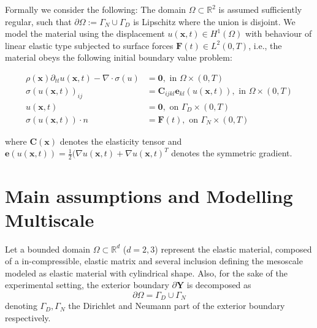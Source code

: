 Formally we consider the following:
The domain $\Omega \subset \mathbb{R}^2$ is assumed sufficiently regular, such that $\partial \Omega := \Gamma_N \cup \Gamma_D$ is Lipschitz where the union is disjoint.
We model the material using the displacement $u(\mathbf{x},t) \in H^1(\Omega)$ with behaviour of linear elastic type subjected to surface forces $\mathbf{F}(t) \in L^2 (0, T)$, i.e., the material obeys the following initial boundary value problem:

\begin{align*}
    \rho (\mathbf{x}) \partial_{tt} u(\mathbf{x},t) - \nabla \cdot \sigma (u) & = \mathbf{0}, \text{ in } \Omega \times (0, T) \\
    \sigma(u(\mathbf{x},t))_{ij} &= \mathbf{C}_{ijkl} \mathbf{e}_{kl}(u(\mathbf{x},t)), \text{ in } \Omega \times (0, T) \\
    u(\mathbf{x},t) &= \mathbf{0}, \text{ on } \Gamma_D \times (0, T) \\
    \sigma(u(\mathbf{x},t)) \cdot n &= \mathbf{F}(t), \text{ on } \Gamma_N \times (0,T)
\end{align*}

where $\mathbf{C}(\mathbf{x})$ denotes the elasticity tensor and $\mathbf{e}(u(\mathbf{x},t)) = \frac{1}{2}\big( \nabla u(\mathbf{x},t) + \nabla u(\mathbf{x},t)^{T}$ denotes the symmetric gradient.

\section{Main assumptions and Modelling Multiscale}
Let a bounded domain $\Omega \subset \mathbb{R}^d$ ($d = 2,3$) represent the elastic material, composed of a in-compressible, elastic matrix and several inclusion defining the mesoscale modeled as elastic material with cylindrical shape. 
Also, for the sake of the experimental setting, the exterior boundary $\partial \mathbf{Y}$ is decomposed as
\begin{equation*}
	\partial \Omega = \Gamma_D \cup \Gamma_N
\end{equation*}
denoting $\Gamma_D, \Gamma_N$ the Dirichlet and Neumann part of the exterior boundary respectively. 

